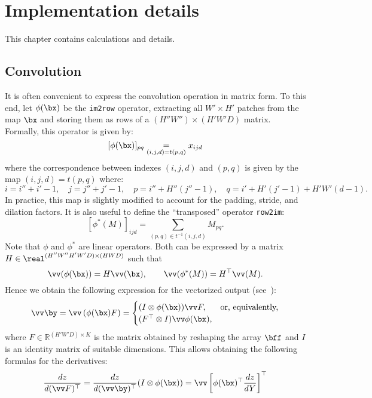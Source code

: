 \chapter{Implementation details}\label{s:impl}

This chapter contains calculations and details.

\section{Convolution}\label{s:impl-convolution}

It is often convenient to express the convolution operation in matrix form. To this end, let $\phi(\bx)$ be the \verb!im2row! operator, extracting all $W' \times H'$ patches from the map $\bx$ and storing them as rows of a $(H''W'') \times (H'W'D)$ matrix. Formally, this operator is given by:
\[
   [\phi(\bx)]_{pq} \underset{(i,j,d)=t(p,q)}{=} x_{ijd}
\]
where the correspondence between indexes $(i,j,d)$ and $(p,q)$ is given by the map $(i,j,d) = t(p,q)$ where:
\[
 i = i''+i'-1, \quad
 j = j''+j'-1, \quad
 p = i'' + H'' (j''-1), \quad
 q = i' + H'(j'-1) + H'W' (d-1).
\]
In practice, this map is slightly modified to account for the padding, stride, and dilation factors. It is also useful to define the ``transposed'' operator \verb!row2im!:
\[
   [\phi^*(M)]_{ijd}
   =
   \sum_{(p,q) \in t^{-1}(i,j,d)}
   M_{pq}.
\]
Note that $\phi$ and $\phi^*$ are linear operators. Both can be expressed by a matrix $H\in\real^{(H''W''H'W'D) \times(HWD)}$ such that
\[
  \vv(\phi(\bx)) = H \vv(\bx), \qquad 
  \vv(\phi^*(M)) = H^\top \vv(M).
\]
Hence we obtain the following expression for the vectorized output (see~\cite{kinghorn96integrals}):
\[
 \vv\by = 
 \vv\left(\phi(\bx) F\right)
 =
 \begin{cases}
 (I \otimes \phi(\bx)) \vv F, & \text{or, equivalently,} \\
 (F^\top \otimes I) \vv \phi(\bx),
 \end{cases}
\]
where $F\in\mathbb{R}^{(H'W'D)\times K}$ is the matrix obtained by reshaping the array $\bff$ and $I$ is an identity matrix of suitable dimensions. This allows obtaining the following formulas for the derivatives:
\[
\frac{dz}{d(\vv F)^\top}
=
\frac{dz}{d(\vv\by)^\top}
(I \otimes \phi(\bx))
= \vv\left[ 
\phi(\bx)^\top 
\frac{dz}{dY}
\right]^\top
\]
